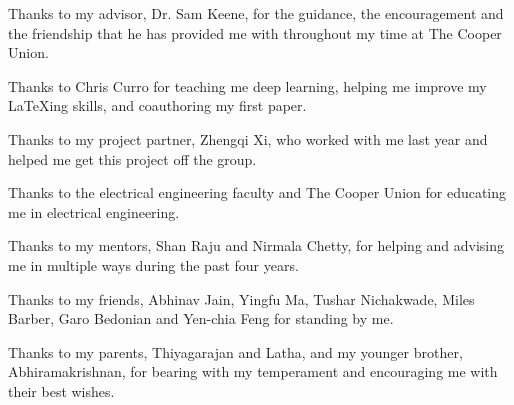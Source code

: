 \begin{acknowledgements}
		
	Thanks to my advisor, Dr. Sam Keene, for the guidance, the encouragement and the friendship that he has provided me with throughout my time at The Cooper Union. 
		
	\smallskip
		
	Thanks to Chris Curro for teaching me deep learning, helping me improve my \LaTeX ing skills, and coauthoring my first paper. 
		
	\smallskip
		
	Thanks to my project partner, Zhengqi Xi, who worked with me last year and helped me get this project off the group. 
		
	\smallskip
		
	Thanks to the electrical engineering faculty and The Cooper Union for educating me in electrical engineering.
		
	\smallskip
		
	Thanks to my mentors, Shan Raju and Nirmala Chetty, for helping and advising me in multiple ways during the past four years. 
		
	\smallskip
		
	Thanks to my friends, Abhinav Jain, Yingfu Ma, Tushar Nichakwade, Miles Barber, Garo Bedonian and Yen-chia Feng for standing by me. 
		
	\smallskip
		
	Thanks to my parents, Thiyagarajan and Latha, and my younger brother, Abhiramakrishnan, for bearing with my temperament and encouraging me with their best wishes. 
		
			
\end{acknowledgements}